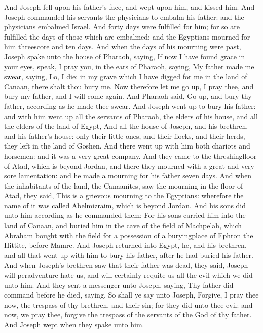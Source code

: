 \begin{biblechapter} %
\verse And Joseph fell upon his father's face, and wept upon him, and kissed him.
\verse And Joseph commanded his servants the physicians to embalm his father: and the physicians embalmed Israel.
\verse And forty days were fulfilled for him; for so are fulfilled the days of those which are embalmed: and the Egyptians mourned for him threescore and ten days.
\verse And when the days of his mourning were past, Joseph spake unto the house of Pharaoh, saying, If now I have found grace in your eyes, speak, I pray you, in the ears of Pharaoh, saying,
\verse My father made me swear, saying, Lo, I die: in my grave which I have digged for me in the land of Canaan, there shalt thou bury me. Now therefore let me go up, I pray thee, and bury my father, and I will come again.
\verse And Pharaoh said, Go up, and bury thy father, according as he made thee swear.
\verse And Joseph went up to bury his father: and with him went up all the servants of Pharaoh, the elders of his house, and all the elders of the land of Egypt,
\verse And all the house of Joseph, and his brethren, and his father's house: only their little ones, and their flocks, and their herds, they left in the land of Goshen.
\verse And there went up with him both chariots and horsemen: and it was a very great company.
\verse And they came to the threshingfloor of Atad, which is beyond Jordan, and there they mourned with a great and very sore lamentation: and he made a mourning for his father seven days.
\verse And when the inhabitants of the land, the Canaanites, saw the mourning in the floor of Atad, they said, This is a grievous mourning to the Egyptians: wherefore the name of it was called Abelmizraim, which is beyond Jordan.
\verse And his sons did unto him according as he commanded them:
\verse For his sons carried him into the land of Canaan, and buried him in the cave of the field of Machpelah, which Abraham bought with the field for a possession of a buryingplace of Ephron the Hittite, before Mamre.
\verse And Joseph returned into Egypt, he, and his brethren, and all that went up with him to bury his father, after he had buried his father.
 And when Joseph's brethren saw that their father was dead, they said, Joseph will peradventure hate us, and will certainly requite us all the evil which we did unto him.
\verse And they sent a messenger unto Joseph, saying, Thy father did command before he died, saying,
\verse So shall ye say unto Joseph, Forgive, I pray thee now, the trespass of thy brethren, and their sin; for they did unto thee evil: and now, we pray thee, forgive the trespass of the servants of the God of thy father. And Joseph wept when they spake unto him.

\end{biblechapter}
